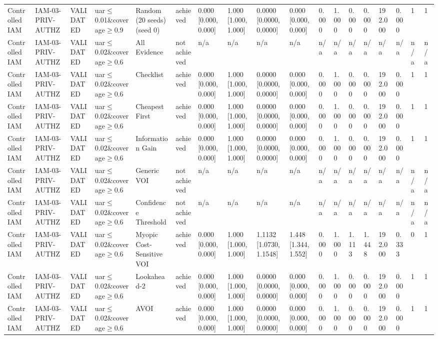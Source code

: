 \begin{table}[!ht]
{\begin{tabular}{llllllllllllllllll}
Controlled IAM & IAM-03-PRIV-AUTHZ & VALIDATED & uar$\le$0.01\&coverage$\ge$0.9 & Random (20 seeds) (seed 0) & achieved & 0.000 [0.000, 0.000] & 1.000 [1.000, 1.000] & 0.0000 [0.0000, 0.0000] & 0.000 [0.000, 0.000] & 0.000 & 1.000 & 0.000 & 0.000 & 192.000 & 0.000 & 1 & 1 \\
Controlled IAM & IAM-03-PRIV-AUTHZ & VALIDATED & uar$\le$0.02\&coverage$\ge$0.6 & All Evidence & not achieved & n/a & n/a & n/a & n/a & n/a & n/a & n/a & n/a & n/a & n/a & n/a & n/a \\
Controlled IAM & IAM-03-PRIV-AUTHZ & VALIDATED & uar$\le$0.02\&coverage$\ge$0.6 & Checklist & achieved & 0.000 [0.000, 0.000] & 1.000 [1.000, 1.000] & 0.0000 [0.0000, 0.0000] & 0.000 [0.000, 0.000] & 0.000 & 1.000 & 0.000 & 0.000 & 192.000 & 0.000 & 1 & 1 \\
Controlled IAM & IAM-03-PRIV-AUTHZ & VALIDATED & uar$\le$0.02\&coverage$\ge$0.6 & Cheapest First & achieved & 0.000 [0.000, 0.000] & 1.000 [1.000, 1.000] & 0.0000 [0.0000, 0.0000] & 0.000 [0.000, 0.000] & 0.000 & 1.000 & 0.000 & 0.000 & 192.000 & 0.000 & 1 & 1 \\
Controlled IAM & IAM-03-PRIV-AUTHZ & VALIDATED & uar$\le$0.02\&coverage$\ge$0.6 & Information Gain & achieved & 0.000 [0.000, 0.000] & 1.000 [1.000, 1.000] & 0.0000 [0.0000, 0.0000] & 0.000 [0.000, 0.000] & 0.000 & 1.000 & 0.000 & 0.000 & 192.000 & 0.000 & 1 & 1 \\
Controlled IAM & IAM-03-PRIV-AUTHZ & VALIDATED & uar$\le$0.02\&coverage$\ge$0.6 & Generic VOI & not achieved & n/a & n/a & n/a & n/a & n/a & n/a & n/a & n/a & n/a & n/a & n/a & n/a \\
Controlled IAM & IAM-03-PRIV-AUTHZ & VALIDATED & uar$\le$0.02\&coverage$\ge$0.6 & Confidence Threshold & not achieved & n/a & n/a & n/a & n/a & n/a & n/a & n/a & n/a & n/a & n/a & n/a & n/a \\
Controlled IAM & IAM-03-PRIV-AUTHZ & VALIDATED & uar$\le$0.02\&coverage$\ge$0.6 & Myopic Cost-Sensitive VOI & achieved & 0.000 [0.000, 0.000] & 1.000 [1.000, 1.000] & 1.1132 [1.0730, 1.1548] & 1.448 [1.344, 1.552] & 0.000 & 1.000 & 1.113 & 1.448 & 192.000 & 0.333 & 0 & 1 \\
Controlled IAM & IAM-03-PRIV-AUTHZ & VALIDATED & uar$\le$0.02\&coverage$\ge$0.6 & Lookahead-2 & achieved & 0.000 [0.000, 0.000] & 1.000 [1.000, 1.000] & 0.0000 [0.0000, 0.0000] & 0.000 [0.000, 0.000] & 0.000 & 1.000 & 0.000 & 0.000 & 192.000 & 0.000 & 1 & 1 \\
Controlled IAM & IAM-03-PRIV-AUTHZ & VALIDATED & uar$\le$0.02\&coverage$\ge$0.6 & AVOI & achieved & 0.000 [0.000, 0.000] & 1.000 [1.000, 1.000] & 0.0000 [0.0000, 0.0000] & 0.000 [0.000, 0.000] & 0.000 & 1.000 & 0.000 & 0.000 & 192.000 & 0.000 & 1 & 1 \\

\end{tabular}}
\end{table}
